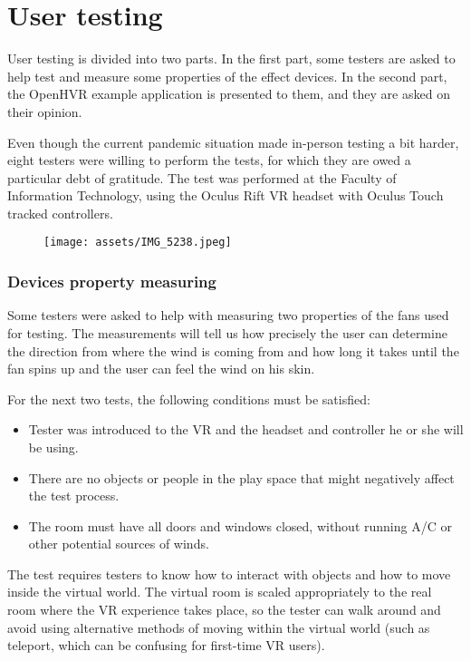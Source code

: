 \chapter{User testing}

User testing is divided into two parts. In the first part,
some testers are asked to help test and measure some properties
of the effect devices. In the second part, the OpenHVR example application is
presented to them, and they are asked on their opinion.


Even though the current pandemic situation made in-person testing a bit harder,
eight testers were willing to perform the tests, for which they are owed
a particular debt of gratitude.
The test was performed at the Faculty of Information Technology, using
the Oculus Rift VR headset with Oculus Touch tracked controllers.


\begin{figure}[h]{}
\centering\texttt{[image: assets/IMG\_5238.jpeg]}
\caption{}

\end{figure}

\hypertarget{x-devices-property-measuring}{\subsection*{Devices property measuring}}
Some testers were asked to help with measuring two properties of the fans used
for testing. The measurements will tell us how precisely the user can determine the
direction from where the wind is coming from and how long it takes until the
fan spins up and the user can feel the wind on his skin.


For the next two tests, the following conditions must be satisfied:


\begin{itemize}

\item Tester was introduced to the VR and the headset and controller
he or she will be using.

\item There are no objects or people in the play space that might negatively affect
the test process.

\item The room must have all doors and windows closed, without running A/C
or other potential sources of winds.

\end{itemize}


The test requires testers to know how to interact with objects and how to move
inside the virtual world. The virtual room is scaled appropriately to the
real room where the VR experience takes place, so the tester can walk around
and avoid using alternative methods of moving within the virtual world
(such as teleport, which can be confusing for first-time VR users).


